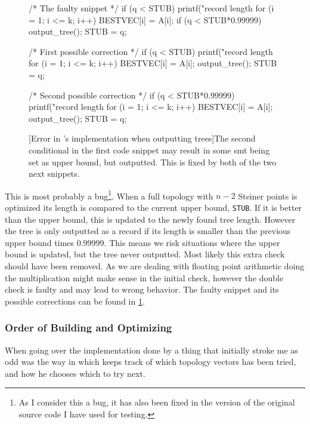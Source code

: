 \begin{figure}[htbp]
\begin{c-code}
/* The faulty snippet */
if (q < STUB) {
  printf("\nnew record length %
  for (i = 1; i <= k; i++) BESTVEC[i] = A[i];
  if (q < STUB*0.99999) output_tree();
  STUB = q;
}

/* First possible correction */
if (q < STUB) {
  printf("\nnew record length %
  for (i = 1; i <= k; i++) BESTVEC[i] = A[i];
  output_tree();
  STUB = q;
}

/* Second possible correction */
if (q < STUB*0.99999) {
  printf("\nnew record length %
  for (i = 1; i <= k; i++) BESTVEC[i] = A[i];
  output_tree();
  STUB = q;
}
\end{c-code}
  [Error in \citeauthor{smith1992}'s implementation when outputting trees]{The
    second conditional in the first code snippet may result in some \ac{smt}
    being set as upper bound, but outputted. This is fixed by both of the two
    next snippets.\label{fig:if-clause-snippet}}
\end{figure}

This is most probably a bug\footnote{As I consider this a bug, it has also been
  fixed in the version of the original source code I have used for
  testing.}. When a full topology with $n-2$ Steiner points is optimized its
length is compared to the current upper bound, \texttt{STUB}. If it is better
than the upper bound, this is updated to the newly found tree length. However
the tree is only outputted as a record if its length is smaller than the
previous upper bound times $0.99999$. This means we risk situations where the
upper bound is updated, but the tree never outputted. Most likely this extra
check should have been removed. As we are dealing with floating point arithmetic
doing the multiplication might make sense in the initial check, however the
double check is faulty and may lead to wrong behavior. The faulty snippet and
its possible corrections can be found in \cref{fig:if-clause-snippet}.

\subsubsection{Order of Building and Optimizing}
\label{sec:order-build-optim}

When going over the implementation done by \citeauthor{smith1992} a thing that
initially stroke me as odd was the way in which \citeauthor{smith1992} keeps
track of which topology vectors has been tried, and how he chooses which to try
next.

